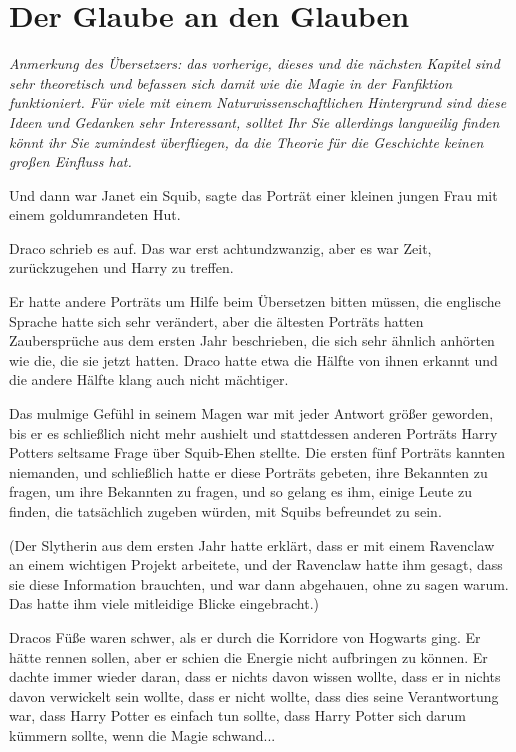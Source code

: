\chapter{Der Glaube an den Glauben}

\emph{Anmerkung des Übersetzers: das vorherige, dieses und die nächsten Kapitel
sind sehr theoretisch und befassen sich damit wie die Magie in der Fanfiktion
funktioniert. Für viele mit einem Naturwissenschaftlichen Hintergrund sind diese
Ideen und Gedanken sehr Interessant, solltet Ihr Sie allerdings langweilig
finden könnt ihr Sie zumindest überfliegen, da die Theorie für die Geschichte
keinen großen Einfluss hat.}

\glqq Und dann war Janet ein Squib\grqq{}, sagte das Porträt einer kleinen
jungen Frau mit einem goldumrandeten Hut.

Draco schrieb es auf. Das war erst achtundzwanzig, aber es war Zeit,
zurückzugehen und Harry zu treffen.

Er hatte andere Porträts um Hilfe beim Übersetzen bitten müssen, die englische
Sprache hatte sich sehr verändert, aber die ältesten Porträts hatten
Zaubersprüche aus dem ersten Jahr beschrieben, die sich sehr ähnlich anhörten
wie die, die sie jetzt hatten. Draco hatte etwa die Hälfte von ihnen erkannt und
die andere Hälfte klang auch nicht mächtiger.

Das mulmige Gefühl in seinem Magen war mit jeder Antwort größer geworden, bis er
es schließlich nicht mehr aushielt und stattdessen anderen Porträts Harry
Potters seltsame Frage über Squib-Ehen stellte. Die ersten fünf Porträts kannten
niemanden, und schließlich hatte er diese Porträts gebeten, ihre Bekannten zu
fragen, um ihre Bekannten zu fragen, und so gelang es ihm, einige Leute zu
finden, die tatsächlich zugeben würden, mit Squibs befreundet zu sein.

(Der Slytherin aus dem ersten Jahr hatte erklärt, dass er mit einem Ravenclaw an
einem wichtigen Projekt arbeitete, und der Ravenclaw hatte ihm gesagt, dass sie
diese Information brauchten, und war dann abgehauen, ohne zu sagen warum. Das
hatte ihm viele mitleidige Blicke eingebracht.)

Dracos Füße waren schwer, als er durch die Korridore von Hogwarts ging. Er hätte
rennen sollen, aber er schien die Energie nicht aufbringen zu können. Er dachte
immer wieder daran, dass er nichts davon wissen wollte, dass er in nichts davon
verwickelt sein wollte, dass er nicht wollte, dass dies seine Verantwortung war,
dass Harry Potter es einfach tun sollte, dass Harry Potter sich darum kümmern
sollte, wenn die Magie schwand...

